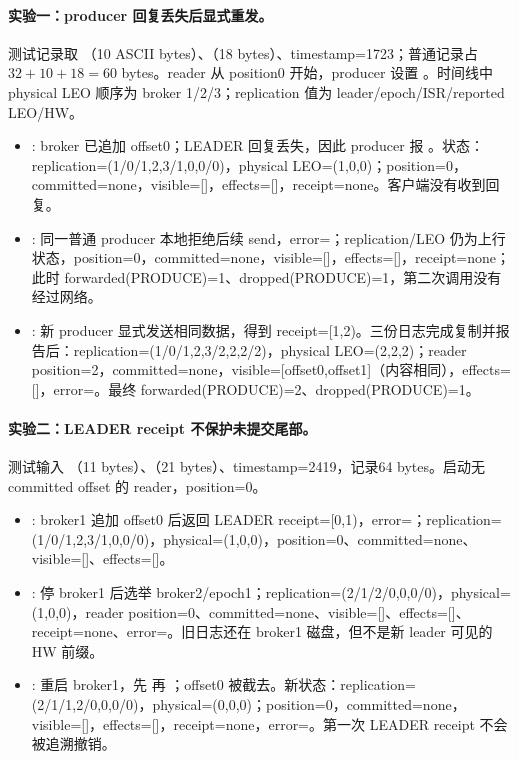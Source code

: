 \paragraph{实验一：producer 回复丢失后显式重发。}测试记录取 （10 ASCII bytes）、（18 bytes）、timestamp=1723；普通记录占 \(32+10+18=60\) bytes。reader 从 position0 开始，producer 设置 。时间线中 physical LEO 顺序为 broker 1/2/3；replication 值为 leader/epoch/ISR/reported LEO/HW。
\begin{itemize}
\item {}: broker 已追加 offset0；LEADER 回复丢失，因此 producer 报 。\newline 状态：replication=(1/0/{1,2,3}/{1,0,0}/0)，physical LEO=(1,0,0)；\newline position=0，committed=none，visible=[]，effects=[]，receipt=none。客户端没有收到回复。
\item {}: 同一普通 producer 本地拒绝后续 send，error=；replication/LEO 仍为上行状态，position=0，committed=none，visible=[]，effects=[]，receipt=none；此时 forwarded(PRODUCE)=1、dropped(PRODUCE)=1，第二次调用没有经过网络。
\item {}: 新 producer 显式发送相同数据，得到 receipt=[1,2)。三份日志完成复制并报告后：\newline replication=(1/0/{1,2,3}/{2,2,2}/2)，physical LEO=(2,2,2)；\newline reader position=2，committed=none，visible=[offset0,offset1]（内容相同），effects=[]，error=。\newline 最终 forwarded(PRODUCE)=2、dropped(PRODUCE)=1。
\end{itemize}
\paragraph{实验二：LEADER receipt 不保护未提交尾部。}测试输入 （11 bytes）、（21 bytes）、timestamp=2419，记录64 bytes。启动无 committed offset 的 reader，position=0。
\begin{itemize}
\item {}: broker1 追加 offset0 后返回 LEADER receipt=[0,1)，error=；replication=(1/0/{1,2,3}/{1,0,0}/0)，physical=(1,0,0)，position=0、committed=none、visible=[]、effects=[]。
\item {}: 停 broker1 后选举 broker2/epoch1；replication=(2/1/{2}/{0,0,0}/0)，physical=(1,0,0)，reader position=0、committed=none、visible=[]、effects=[]、receipt=none、error=。旧日志还在 broker1 磁盘，但不是新 leader 可见的 HW 前缀。
\item {}: 重启 broker1，先  再 ；offset0 被截去。\newline 新状态：replication=(2/1/{1,2}/{0,0,0}/0)，physical=(0,0,0)；\newline position=0，committed=none，visible=[]，effects=[]，receipt=none，error=。第一次 LEADER receipt 不会被追溯撤销。
\end{itemize}
